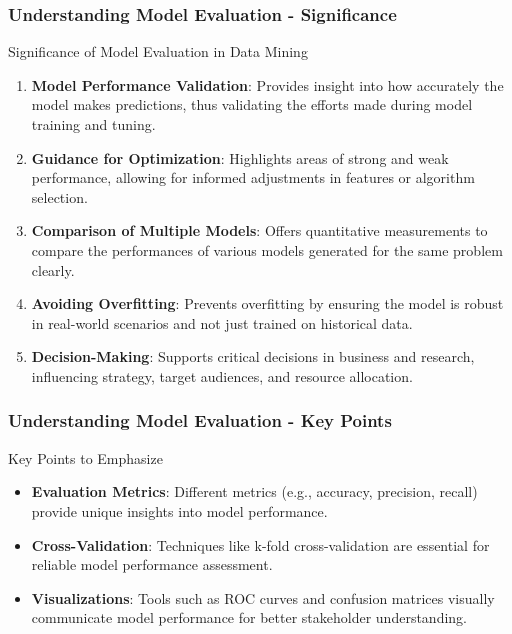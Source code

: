 \documentclass{beamer}
\begin{document}
\begin{frame}[fragile]
    \frametitle{Understanding Model Evaluation - Significance}
    \begin{block}{Significance of Model Evaluation in Data Mining}
        \begin{enumerate}
            \item \textbf{Model Performance Validation}: Provides insight into how accurately the model makes predictions, thus validating the efforts made during model training and tuning.
            \item \textbf{Guidance for Optimization}: Highlights areas of strong and weak performance, allowing for informed adjustments in features or algorithm selection.
            \item \textbf{Comparison of Multiple Models}: Offers quantitative measurements to compare the performances of various models generated for the same problem clearly.
            \item \textbf{Avoiding Overfitting}: Prevents overfitting by ensuring the model is robust in real-world scenarios and not just trained on historical data.
            \item \textbf{Decision-Making}: Supports critical decisions in business and research, influencing strategy, target audiences, and resource allocation.
        \end{enumerate}
    \end{block}
\end{frame}

\begin{frame}[fragile]
    \frametitle{Understanding Model Evaluation - Key Points}
    \begin{block}{Key Points to Emphasize}
        \begin{itemize}
            \item \textbf{Evaluation Metrics}: Different metrics (e.g., accuracy, precision, recall) provide unique insights into model performance.
            \item \textbf{Cross-Validation}: Techniques like k-fold cross-validation are essential for reliable model performance assessment.
            \item \textbf{Visualizations}: Tools such as ROC curves and confusion matrices visually communicate model performance for better stakeholder understanding.
        \end{itemize}
    \end{block}
\end{frame}
\end{document}
